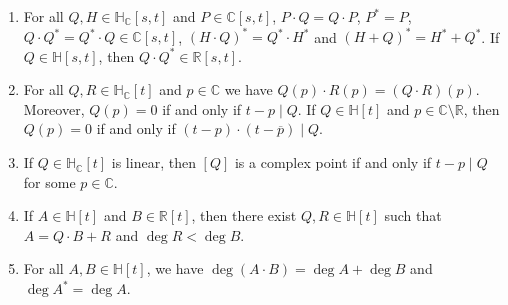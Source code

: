 \documentclass[11pt]{article}
\newenvironment{claims}{\begin{enumerate}[topsep=0pt,itemsep=0pt,leftmargin=8mm,label=\textnormal{\textbf{(\alph*)}},ref=(\alph*)]}{\end{enumerate}}
\newcommand{\C}{\mathbb{C}}
\newcommand{\R}{\mathbb{R}}
\renewcommand{\H}{\mathbb{H}}
\newcommand{\HC}{\mathbb{H}_{\C}}
\newcommand{\st}{such that }
\begin{document}
\begin{lemma}
\label{lem:basic}
\hspace{1em}
\begin{claims}
\item\label{lem:basic:a}
For all $Q,H\in\HC[s,t]$ and $P\in\C[s,t]$,
$P\cdot Q=Q\cdot P$,
$P^*=P$,
$Q\cdot Q^*=Q^*\cdot Q\in \C[s,t]$,
$(H\cdot Q)^*=Q^*\cdot H^*$
and $(H+Q)^*=H^*+Q^*$.
If $Q\in \H[s,t]$, then $Q\cdot Q^*\in \R[s,t]$.

\item\label{lem:basic:b}
For all $Q,R\in\HC[t]$ and $p\in\C$
we have $Q(p)\cdot R(p)=(Q\cdot R)(p)$.
Moreover, $Q(p)=0$ if and only if $t-p \mid Q$.
If $Q\in\H[t]$ and $p\in\C\setminus\R$,
then $Q(p)=0$ if and only if $(t-p)\cdot(t-\overline{p})\mid Q$.


\item\label{lem:basic:c}
If $Q\in\HC[t]$ is linear, then $[Q]$ is a complex point if and only if
$t-p\mid Q$ for some $p\in\C$.

\item\label{lem:basic:d}
If $A\in\H[t]$ and $B\in\R[t]$, then there exist
$Q,R\in\H[t]$ \st $A=Q\cdot B+R$ and $\deg R<\deg B$.

\item\label{lem:basic:e}
For all $A,B\in\H[t]$,
we have $\deg(A\cdot B)=\deg A+\deg B$ and $\deg A^*=\deg A$.


\end{claims}
\end{lemma}
\end{document}
